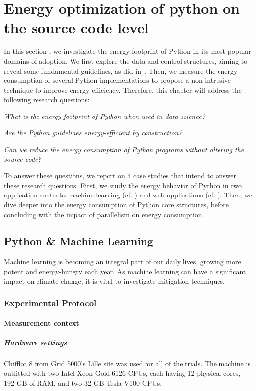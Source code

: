 \section{Energy optimization of python on the source code level}\label{python:sec_insights}
In this section , we investigate the energy footprint of Python in its most popular domains of adoption.
We first explore the data and control structures, aiming to reveal some fundamental guidelines, as \citeauthor{hasan_energy_2016} did in~\cite{hasan_energy_2016}.
Then, we measure the energy consumption of several Python implementations to propose a non-intrusive technique to improve energy efficiency.
Therefore, this chapter will address the following research questions:
\begin{compactenum}[\indent\bf RQ\,1:]
    \item \emph{What is the energy footprint of Python when used in data science?}
    \item \emph{Are the Python guidelines energy-efficient by construction?}
    \item \emph{Can we reduce the energy consumption of Python programs without altering the source code?}
\end{compactenum}

To answer these questions, we report on 4 case studies that intend to answer these research questions.
First, we study the energy behavior of Python in two application contexts: machine learning (cf. ) and  web applications (cf. ).
Then, we dive deeper into the energy consumption of Python core structures, before concluding with the impact of parallelism on energy consumption.


\subsection{Python \& Machine Learning}\label{sec:ml}
Machine learning is becoming an integral part of our daily lives, growing more potent and energy-hungry each year.
As machine learning can have a significant impact on climate change, it is vital to investigate mitigation techniques.
\subsubsection{Experimental Protocol}
\paragraph{Measurement context}
\subparagraph{Hardware settings}
Chifflot 8 from Grid 5000's Lille site was used for all of the trials.
The machine is outfitted with two Intel Xeon Gold 6126 CPUs, each having 12 physical cores, 192 GB of RAM, and two 32 GB Tesla V100 GPUs.

